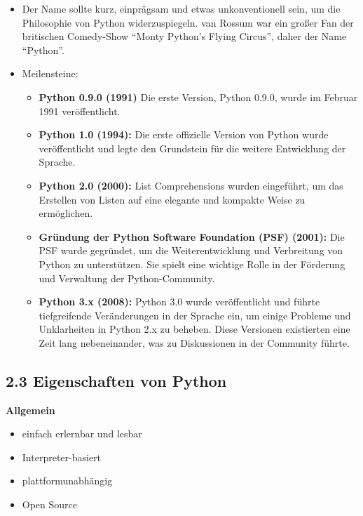 \documentclass[
  11pt,
  a4paper,
  DIV=11,
  numbers=noendperiod]{scrartcl}
\providecommand{\tightlist}{%
  \setlength{\itemsep}{0pt}\setlength{\parskip}{0pt}}\usepackage{longtable,booktabs,array}
\begin{document}
\begin{itemize}
\item
  Der Name sollte kurz, einprägsam und etwas unkonventionell sein, um
  die Philosophie von Python widerzuspiegeln. van Rossum war ein großer
  Fan der britischen Comedy-Show ``Monty Python's Flying Circus'', daher
  der Name ``Python''.
\item
  Meilensteine:

  \begin{itemize}
  \tightlist
  \item
    \textbf{Python 0.9.0 (1991)} Die erste Version, Python 0.9.0, wurde
    im Februar 1991 veröffentlicht.
  \item
    \textbf{Python 1.0 (1994):} Die erste offizielle Version von Python
    wurde veröffentlicht und legte den Grundstein für die weitere
    Entwicklung der Sprache.
  \item
    \textbf{Python 2.0 (2000):} List Comprehensions wurden eingeführt,
    um das Erstellen von Listen auf eine elegante und kompakte Weise zu
    ermöglichen.
  \item
    \textbf{Gründung der Python Software Foundation (PSF) (2001):} Die
    PSF wurde gegründet, um die Weiterentwicklung und Verbreitung von
    Python zu unterstützen. Sie spielt eine wichtige Rolle in der
    Förderung und Verwaltung der Python-Community.
  \item
    \textbf{Python 3.x (2008):} Python 3.0 wurde veröffentlicht und
    führte tiefgreifende Veränderungen in der Sprache ein, um einige
    Probleme und Unklarheiten in Python 2.x zu beheben. Diese Versionen
    existierten eine Zeit lang nebeneinander, was zu Diskussionen in der
    Community führte.
  \end{itemize}
\end{itemize}

\subsection{2.3 Eigenschaften von
Python}\label{eigenschaften-von-python}

\textbf{Allgemein}

\begin{itemize}
\tightlist
\item
  einfach erlernbar und lesbar
\item
  Interpreter-basiert
\item
  plattformunabhängig
\item
  Open Source
\end{itemize}
\end{document}
